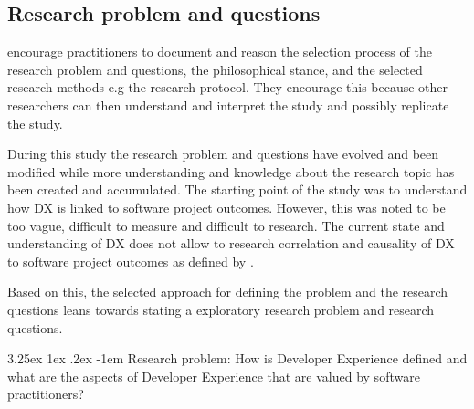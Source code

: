 \documentclass[english, 12pt, a4paper, sci, utf8, a-1b, online]{aaltothesis}
\makeatletter
\renewcommand\paragraph{\@startsection{paragraph}{5}{\z@}%
  {3.25ex \@plus1ex \@minus.2ex}%
  {-1em}%
  {\normalfont\normalsize\bfseries}}
\makeatother
\begin{document}
\subsection{Research problem and questions}

\cite{easterbrook2008selecting} encourage practitioners to document and reason the selection process of the research problem and questions, the philosophical stance, and the selected research methods e.g the research protocol. They encourage this because other researchers can then understand and interpret the study and possibly replicate the study.

During this study the research problem and questions have evolved and been modified while more understanding and knowledge about the research topic has been created and accumulated. The starting point of the study was to understand how DX is linked to software project outcomes. However, this was noted to be too vague, difficult to measure and difficult to research. The current state and understanding of DX does not allow to research correlation and causality of DX to software project outcomes as defined by \cite{easterbrook2008selecting}.

Based on this, the selected approach for defining the problem and the research questions leans towards stating a exploratory research problem and research questions.

\newcommand{\researchproblem}{How is Developer Experience defined and what are the aspects of Developer Experience that are valued by software practitioners?}

\paragraph{Research problem:} \researchproblem

\newcommand{\rqone}{What is the definition and aspects of Developer Experience, and how do they differ between scientific literature and literature written by practitioners?}
\newcommand{\rqonepointone}{What objects/entities have been studied with respect to developer experience?}
\newcommand{\rqonepointtwo}{What methods have been used to study developer experience?}
\newcommand{\rqonepointthree}{What are the main results of the existing research on developer experience?}
\newcommand{\rqonepointfour}{What is known about factors that improve or worsen developer experience?}
\newcommand{\rqtwo}{How is developer experience and its aspects defined by different roles (or software developers) in a software consultancy company?}
\newcommand{\rqtwopointone}{What different experience objects of Developer Experience are there in the software consultancy company?}
\newcommand{\rqtwopointtwo}{What factors related to the experience object improves or worsens the developer dxperience?}
\newcommand{\rqtwopointthree}{How the developer experience of the experience objects be improved?}
\end{document}
